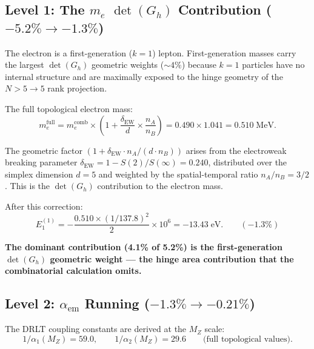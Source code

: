 \documentclass[12pt]{article}
\theoremstyle{remark}
\theoremstyle{definition}
\begin{document}
\subsection{Level 1: The $m_e$ $\det(G_h)$ Contribution ($-5.2\% \to -1.3\%$)}

The electron is a first-generation ($k = 1$) lepton. First-generation masses carry the largest $\det(G_h)$ geometric weights ($\sim 4\%$) because $k = 1$ particles have no internal structure and are maximally exposed to the hinge geometry of the $N > 5 \to 5$ rank projection.

The full topological electron mass:
\begin{equation}
m_e^\text{full} = m_e^\text{comb} \times \left(1 + \frac{\delta_\text{EW}}{d} \times \frac{n_A}{n_B}\right) = 0.490 \times 1.041 = 0.510\;\text{MeV}.
\end{equation}

The geometric factor $(1 + \delta_\text{EW} \cdot n_A/(d \cdot n_B))$ arises from the electroweak breaking parameter $\delta_\text{EW} = 1 - S(2)/S(\infty) = 0.240$, distributed over the simplex dimension $d = 5$ and weighted by the spatial-temporal ratio $n_A/n_B = 3/2$. This is the $\det(G_h)$ contribution to the electron mass.

After this correction:
\begin{equation}
E_1^{(1)} = -\frac{0.510 \times (1/137.8)^2}{2} \times 10^6 = -13.43\;\text{eV}. \qquad (-1.3\%)
\end{equation}

\textbf{The dominant contribution (4.1\% of 5.2\%) is the first-generation $\det(G_h)$ geometric weight --- the hinge area contribution that the combinatorial calculation omits.}

\subsection{Level 2: $\alpha_\text{em}$ Running ($-1.3\% \to -0.21\%$)}

The DRLT coupling constants are derived at the $M_Z$ scale:
\begin{equation}
1/\alpha_1(M_Z) = 59.0, \qquad 1/\alpha_2(M_Z) = 29.6 \qquad \text{(full topological values)}.
\end{equation}
\end{document}
